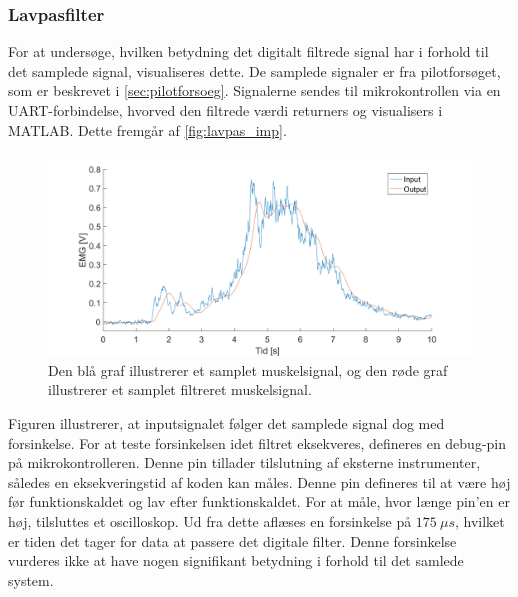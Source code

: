 \subsubsection{Lavpasfilter} \label{sec:lavpas_test}
For at undersøge, hvilken betydning det digitalt filtrede signal har i forhold til det samplede signal, visualiseres dette. 
De samplede signaler er fra pilotforsøget, som er beskrevet i \autoref{sec:pilotforsoeg}. 
Signalerne sendes til mikrokontrollen via en UART-forbindelse, hvorved den filtrede værdi returners og visualisers i MATLAB. 
Dette fremgår af \autoref{fig:lavpas_imp}.

\begin{figure}[H]
\centering
\includegraphics[width=1\textwidth]{figures/EMG_test}
\caption{Den blå graf illustrerer et samplet muskelsignal, og den røde graf illustrerer et samplet filtreret muskelsignal.}
\label{fig:lavpas_imp}
\end{figure}

\noindent
Figuren illustrerer, at inputsignalet følger det samplede signal dog med forsinkelse. 
For at teste forsinkelsen idet filtret eksekveres, defineres en debug-pin på mikrokontrolleren. Denne pin tillader tilslutning af eksterne instrumenter, således en eksekveringstid af koden kan måles.  
Denne pin defineres til at være høj før funktionskaldet og lav efter funktionskaldet. 
For at måle, hvor længe pin'en er høj, tilsluttes et oscilloskop. 
Ud fra dette aflæses en forsinkelse på $175~\mu s$, hvilket er tiden det tager for data at passere det digitale filter.
Denne forsinkelse vurderes ikke at have nogen signifikant betydning i forhold til det samlede system.

